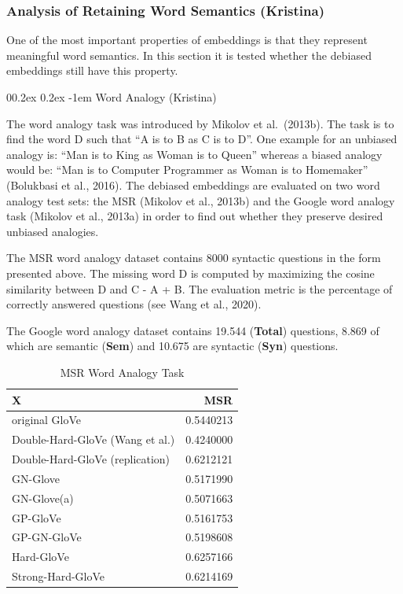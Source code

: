\documentclass[
  english,
  man,floatsintext]{apa6}
\makeatletter
\let\oldparagraph\paragraph
\renewcommand{\paragraph}[1]{\oldparagraph{#1}\mbox{}}
\renewcommand{\paragraph}{\@startsection{paragraph}{4}{\parindent}%
  {0\baselineskip \@plus 0.2ex \@minus 0.2ex}%
  {-1em}%
  {\normalfont\normalsize\bfseries\itshape\typesectitle}}
\makeatother
\begin{document}
\hypertarget{analysis-of-retaining-word-semantics-kristina}{%
\subsubsection{Analysis of Retaining Word Semantics (Kristina)}\label{analysis-of-retaining-word-semantics-kristina}}

One of the most important properties of embeddings is that they represent meaningful word semantics. In this section it is tested whether the debiased embeddings still have this property.

\hypertarget{word-analogy-kristina}{%
\paragraph{Word Analogy (Kristina)}\label{word-analogy-kristina}}

The word analogy task was introduced by Mikolov et al.~(2013b). The task is to find the word D such that \enquote{A is to B as C is to D}. One example for an unbiased analogy is: \enquote{Man is to King as Woman is to Queen} whereas a biased analogy would be: \enquote{Man is to Computer Programmer as Woman is to Homemaker} (Bolukbasi et al., 2016). The debiased embeddings are evaluated on two word analogy test sets: the MSR (Mikolov et al., 2013b) and the Google word analogy task (Mikolov et al., 2013a) in order to find out whether they preserve desired unbiased analogies.

The MSR word analogy dataset contains 8000 syntactic questions in the form presented above. The missing word D is computed by maximizing the cosine similarity between D and C - A + B. The evaluation metric is the percentage of correctly answered questions (see Wang et al., 2020).

The Google word analogy dataset contains 19.544 (\textbf{Total}) questions, 8.869 of which are semantic (\textbf{Sem}) and 10.675 are syntactic (\textbf{Syn}) questions.

\begin{table}

\caption{\label{tab:unnamed-chunk-5}MSR Word Analogy Task}
\centering
\begin{tabular}[t]{l|r}
\hline
X & MSR\\
\hline
original GloVe & 0.5440213\\
\hline
Double-Hard-GloVe (Wang et al.) & 0.4240000\\
\hline
Double-Hard-GloVe (replication) & 0.6212121\\
\hline
GN-Glove & 0.5171990\\
\hline
GN-Glove(a) & 0.5071663\\
\hline
GP-GloVe & 0.5161753\\
\hline
GP-GN-GloVe & 0.5198608\\
\hline
Hard-GloVe & 0.6257166\\
\hline
Strong-Hard-GloVe & 0.6214169\\
\hline
\end{tabular}
\end{table}
\end{document}
